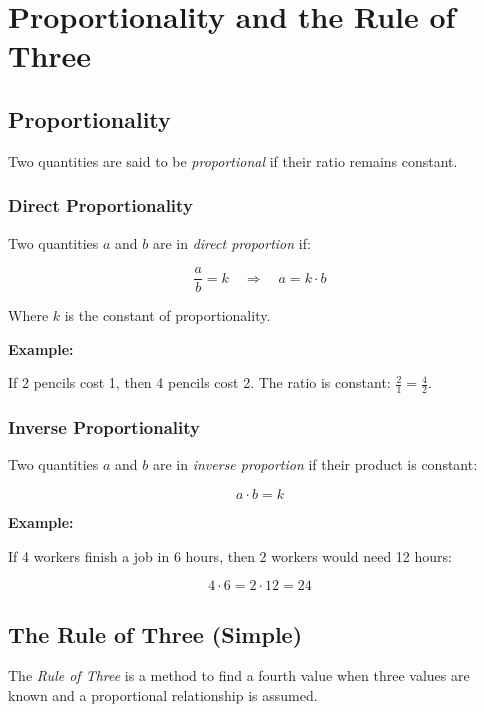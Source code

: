 \newpage
\section{Proportionality and the Rule of Three}

\subsection{Proportionality}

Two quantities are said to be \emph{proportional} if their ratio remains constant.

\subsubsection{Direct Proportionality}

Two quantities \(a\) and \(b\) are in \emph{direct proportion} if:

\[
    \frac{a}{b} = k \quad \Rightarrow \quad a = k \cdot b
\]

Where \(k\) is the constant of proportionality.
\vspace{\baselineskip}

\textbf{Example:}
\vspace{\baselineskip}
 
If 2 pencils cost 1, then 4 pencils cost 2. The ratio is constant: \(\frac{2}{1} = \frac{4}{2}\).

\subsubsection{Inverse Proportionality}

Two quantities \(a\) and \(b\) are in \emph{inverse proportion} if their product is constant:

\[
    a \cdot b = k
\]

\textbf{Example:}
\vspace{\baselineskip}

If 4 workers finish a job in 6 hours, then 2 workers would need 12 hours:

\[
    4 \cdot 6 = 2 \cdot 12 = 24
\]

\subsection{The Rule of Three (Simple)}

The \emph{Rule of Three} is a method to find a fourth value when three values are known and a 
proportional relationship is assumed.

